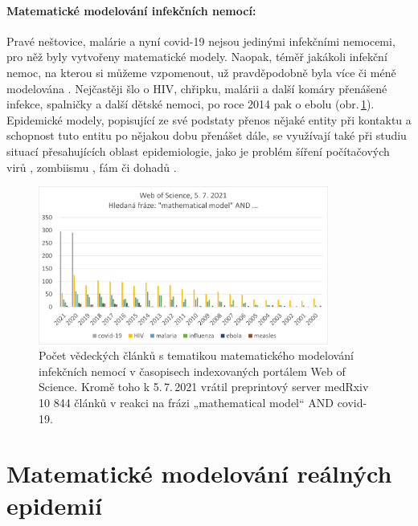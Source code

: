 
\paragraph{Matematické modelování infekčních nemocí:} Pravé neštovice, malárie a nyní covid-19 nejsou jedinými infekčními nemocemi, pro něž byly vytvořeny matematické modely. Naopak, téměř jakákoli infekční nemoc, na kterou si můžeme vzpomenout, už pravděpodobně byla více či méně modelována \cite{AndersonMay1991,KeelingRohani2008,VynnyckyWhite2010,Ronn_etal2017,Finger_etal2019}. Nejčastěji šlo o HIV, chřipku, malárii a další komáry přenášené infekce, spalničky a další dětské nemoci, po roce 2014 pak o ebolu (obr.\,\ref{wos}). Epidemické modely, popisující ze své podstaty přenos nějaké entity při kontaktu a schopnost tuto entitu po nějakou dobu přenášet dále, se využívají také při studiu situací přesahujících oblast epidemiologie, jako je problém šíření počítačových virů \cite{YangYang2014}, zombiismu \cite{Alemi_etal2015}, fám či dohadů \cite{DaleyKendall1964}.

\begin{figure}[h]
\begin{center}
	\includegraphics[width=0.85\textwidth]{pic/wos_papers.png}
\end{center}
\caption{Počet vědeckých článků s tematikou matematického modelování infekčních nemocí v časopisech indexovaných portálem Web of Science. Kromě toho k 5.\,7.\,2021 vrátil preprintový server medRxiv 10 844 článků v reakci na frázi „mathematical model“ AND covid-19.}
\label{wos}
\end{figure}

\section*{Matematické modelování reálných epidemií}

